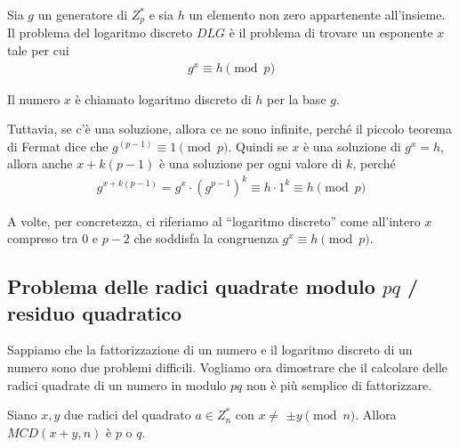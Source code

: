 \begin{definition}
Sia \(g\) un generatore di $Z_p^*$ e sia $h$ un elemento non zero appartenente all'insieme. Il problema del logaritmo discreto $DLG$ è il problema di trovare un esponente $x$ tale per cui
\begin{align*}
    g^x \equiv h \pmod p
\end{align*}

\noindent Il numero $x$ è chiamato logaritmo discreto di $h$ per la base $g$.
\end{definition}

\noindent Tuttavia, se c'è una soluzione, allora ce ne sono infinite, perché il piccolo teorema di Fermat dice che $g^{(p-1)} \equiv 1 \pmod p$. Quindi se $x$ è una soluzione di $g^x = h$, allora anche $x + k(p - 1)$ è una soluzione per ogni valore di $k$, perché
\begin{align*}
    g^{x+k(p-1)} = g^x \cdot (g^{p-1})^k \equiv h \cdot 1^k \equiv h \pmod p
\end{align*}

\noindent A volte, per concretezza, ci riferiamo al “logaritmo discreto” come all'intero $x$ compreso tra $0$ e $p - 2$ che soddisfa la congruenza $g^x \equiv h \pmod p$.

\subsection{Problema delle radici quadrate modulo $pq$ / residuo quadratico}
Sappiamo che la fattorizzazione di un numero e il logaritmo discreto di un numero sono due problemi difficili. Vogliamo ora dimostrare che il calcolare delle radici quadrate di un numero in modulo $pq$ non è più semplice di fattorizzare.
\begin{lemma}
Siano $x, y$ due radici del quadrato $a \in Z_n^*$ con $x \ne$ $\pm y \pmod n$. Allora $MCD(x+y, n)$ è $p$ o $q$.
\end{lemma}

